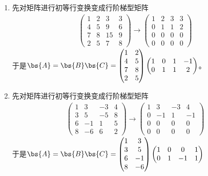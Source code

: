 \documentclass[12pt, a4paper, oneside, UTF8]{ctexbook}
\begin{document}
\begin{solution}
    \begin{enumerate}[label=(\arabic*)]
        \item 先对矩阵进行初等行变换变成行阶梯型矩阵
        \begin{align*}
            \begin{pmatrix}
                1&2&3&3\\
                4&5&9&6\\
                7&8&15&9\\
                2&5&7&8
            \end{pmatrix} \xrightarrow{}
            \begin{pmatrix}
                1&2&3&3\\
                0&1&1&2\\
                0&0&0&0\\
                0&0&0&0
            \end{pmatrix}
        \end{align*}
        于是$\bs{A}=\bs{B}\bs{C}=\begin{pmatrix}
            1&2\\
            4&5\\
            7&8\\
            2&5
        \end{pmatrix}\begin{pmatrix}
            1&0&1&-1\\
            0&1&1&2\\
        \end{pmatrix}$。
    \item 先对矩阵进行初等行变换变成行阶梯型矩阵
    \begin{align*}
        \begin{pmatrix}
            1&3&-3&4\\
            3&5&-5&8\\
            6&-1&1&5\\
            8&-6&6&2
        \end{pmatrix} \xrightarrow{}
        \begin{pmatrix}
            1&3&-3&4\\
            0&-1&1&-1\\
            0&0&0&0\\
            0&0&0&0
        \end{pmatrix}
    \end{align*}
    于是$\bs{A}=\bs{B}\bs{C}=\begin{pmatrix}
        1&3\\
        3&5\\
        6&-1\\
        8&-6
    \end{pmatrix}\begin{pmatrix}
        1&0&0&1\\
        0&1&-1&1\\
    \end{pmatrix}$
    \end{enumerate}
\end{solution}
\end{document}
